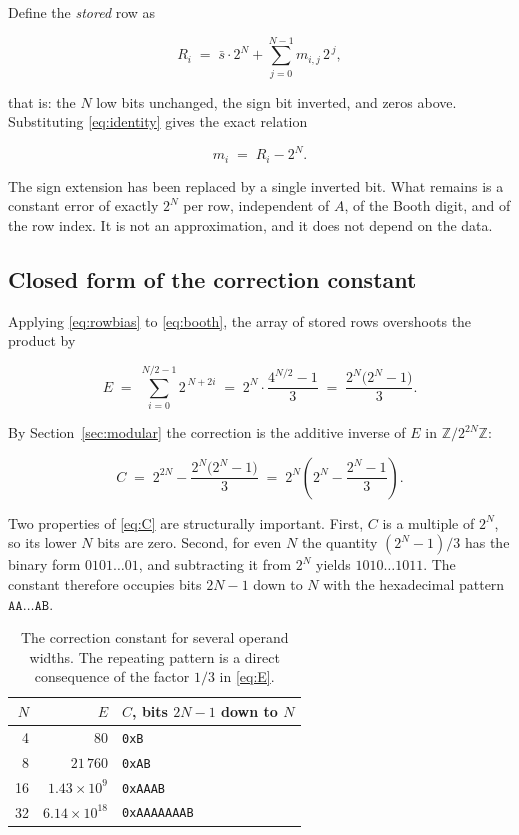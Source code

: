 \documentclass[11pt,a4paper]{article}
\begin{document}
Define the \emph{stored} row as

\begin{equation}
R_i \;=\; \bar{s}\cdot 2^N + \sum_{j=0}^{N-1} m_{i,j}\,2^{\,j},
\end{equation}

that is: the $N$ low bits unchanged, the sign bit inverted, and zeros above.
Substituting \eqref{eq:identity} gives the exact relation

\begin{equation}
m_i \;=\; R_i - 2^N.
\label{eq:rowbias}
\end{equation}

The sign extension has been replaced by a single inverted bit. What remains is
a constant error of exactly $2^N$ per row, independent of $A$, of the Booth
digit, and of the row index. It is not an approximation, and it does not depend
on the data.

\subsection{Closed form of the correction constant}

Applying \eqref{eq:rowbias} to \eqref{eq:booth}, the array of stored rows
overshoots the product by

\begin{equation}
E \;=\; \sum_{i=0}^{N/2-1} 2^{\,N+2i}
     \;=\; 2^N \cdot \frac{4^{N/2}-1}{3}
     \;=\; \frac{2^N\bigl(2^N-1\bigr)}{3}.
\label{eq:E}
\end{equation}

By Section~\ref{sec:modular} the correction is the additive inverse of $E$ in
$\mathbb{Z}/2^{2N}\mathbb{Z}$:

\begin{equation}
C \;=\; 2^{2N} - \frac{2^N\bigl(2^N-1\bigr)}{3}
   \;=\; 2^N\left(2^N - \frac{2^N-1}{3}\right).
\label{eq:C}
\end{equation}

Two properties of \eqref{eq:C} are structurally important. First, $C$ is a
multiple of $2^N$, so its lower $N$ bits are zero. Second, for even $N$ the
quantity $(2^N-1)/3$ has the binary form $0101\ldots01$, and subtracting it from
$2^N$ yields $1010\ldots1011$. The constant therefore occupies bits $2N-1$ down
to $N$ with the hexadecimal pattern $\mathtt{AA}\ldots\mathtt{AB}$.

\begin{table}[!ht]
\centering\small
\begin{tabular}{@{}rrl@{}}
\toprule
$N$ & $E$ & $C$, bits $2N{-}1$ down to $N$ \\
\midrule
 4 & $80$                 & \texttt{0xB} \\
 8 & $21\,760$            & \texttt{0xAB} \\
16 & $1.43\times10^{9}$   & \texttt{0xAAAB} \\
32 & $6.14\times10^{18}$  & \texttt{0xAAAAAAAB} \\
\bottomrule
\end{tabular}
\caption{The correction constant for several operand widths. The repeating
pattern is a direct consequence of the factor $1/3$ in \eqref{eq:E}.}
\label{tab:const}
\end{table}
\end{document}
